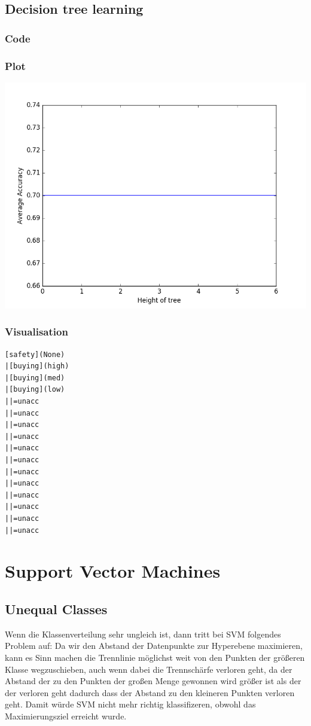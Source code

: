 \documentclass{article}
\begin{document}
\subsection{Decision tree learning}
\subsubsection{Code}

\subsubsection{Plot}
\includegraphics[width=\textwidth]{accuracies.png}
\subsubsection{Visualisation}
\begin{lstlisting}
[safety](None)
|[buying](high)
|[buying](med)
|[buying](low)
||=unacc
||=unacc
||=unacc
||=unacc
||=unacc
||=unacc
||=unacc
||=unacc
||=unacc
||=unacc
||=unacc
||=unacc
\end{lstlisting}

\section{Support Vector Machines}
\subsection{Unequal Classes}
Wenn die Klassenverteilung sehr ungleich ist, dann tritt bei SVM folgendes Problem auf: Da wir den Abstand der Datenpunkte zur Hyperebene maximieren, kann es Sinn machen die Trennlinie möglichst weit von den Punkten der größeren Klasse wegzuschieben, auch wenn dabei die Trennschärfe verloren geht, da der Abstand der zu den Punkten der großen Menge gewonnen wird größer ist als der der verloren geht dadurch dass der Abstand zu den kleineren Punkten verloren geht. Damit würde SVM nicht mehr richtig klassifizeren, obwohl das Maximierungsziel erreicht wurde.
\end{document}
